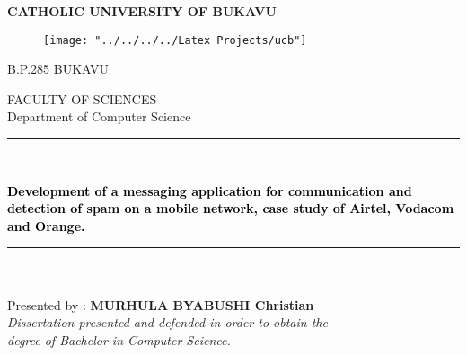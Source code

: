 \documentclass[12pt,a4paper]{report}
\begin{document}
 
	\begin{titlepage}
	\begin{center}
		\LARGE{{\textbf{CATHOLIC UNIVERSITY OF BUKAVU}}}\\
		\begin{center}
			\begin{figure}[h]
				\centering
					\texttt{[image: "../../../../Latex Projects/ucb"]}
			\end{figure}
			\large{\underline{B.P.285 BUKAVU}}
				\vspace{0.3cm}
		\end{center}
		\hspace*{0.5cm}
		{\large {\huge {\LARGE 	FACULTY OF SCIENCES  \textsf{}}}}\\ 
			{\Large \hspace*{0.7cm} Department of Computer Science}
			\vspace*{0.1cm}
			\setlength{\fboxsep}{4mm}
			\setlength{\fboxrule}{1mm}
			\vspace{0.5 cm}
			\rule{1\textwidth}{3pt}\\
			\vspace{0.18 cm}
			\begin{minipage}[c]{15cm}
				\begin{center}
					\LARGE{\textbf{\textcolor{black}{Development of a messaging application for communication and detection of spam on a mobile network, case study of Airtel, Vodacom and Orange.}}}
				\end{center}
		\end{minipage}
	\end{center}
	\hspace{3pt}\rule{1\textwidth}{3pt}
	\vspace{0.1cm}
	\begin {minipage}{0.5 \textwidth }	
	\begin{flushright}
		{\large 
			\vspace {0.1cm} 
			\begin{tabbing}					
				\hspace*{1cm} \\
				\\
				\hspace*{2cm} Presented by : \textbf{MURHULA BYABUSHI Christian}  \\
				\hspace{2cm} \textit{Dissertation presented and defended in order to obtain the} \\
				\hspace{2cm} \textit{degree of Bachelor in Computer Science.}\\

\end{tabbing}}
\end{flushright}
\end{minipage}
\end{titlepage}
\end{document}
